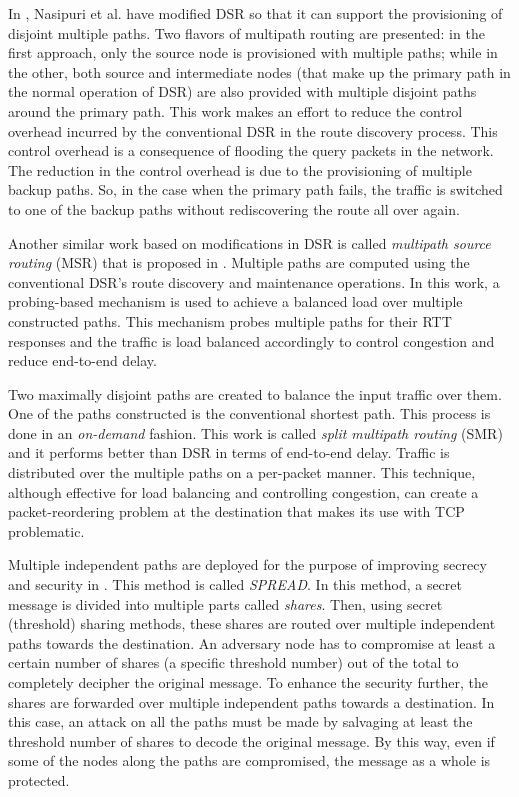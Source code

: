 \documentclass[10pt]{IEEEtran}
\begin{document}
In \cite{nasipuri1999demand}, Nasipuri et al. have modified DSR so that it can support the provisioning of disjoint multiple paths. Two flavors of multipath routing are presented: in the first approach, only the source node is provisioned with multiple paths; while in the other, both source and intermediate nodes (that make up the primary path in the normal operation of DSR) are also provided with multiple disjoint paths around the primary path. This work makes an effort to reduce the control overhead incurred by the conventional DSR in the route discovery process. This control overhead is a consequence of flooding the query packets in the network. The reduction in the control overhead is due to the provisioning of multiple backup paths. So, in the case when the primary path fails, the traffic is switched to one of the backup paths without rediscovering the route all over again.

Another similar work based on modifications in DSR is called \textit{multipath source routing} (MSR) that is proposed in \cite{wang2000multipath}. Multiple paths are computed using the conventional DSR's route discovery and maintenance operations. In this work, a probing-based mechanism is used to achieve a balanced load over multiple constructed paths. This mechanism probes multiple paths for their RTT responses and the traffic is load balanced accordingly to control congestion and reduce end-to-end delay.

Two maximally disjoint paths are created to balance the input traffic over them. One of the paths constructed is the conventional shortest path. This process is done in an \textit{on-demand} fashion. This work is called \textit{split multipath routing} (SMR) \cite{lee2001split} and it performs better than DSR in terms of end-to-end delay. Traffic is distributed over the multiple paths on a per-packet manner. This technique, although effective for load balancing and controlling congestion, can create a packet-reordering problem at the destination that makes its use with TCP problematic.

Multiple independent paths are deployed for the purpose of improving secrecy and security in \cite{lou2004spread}. This method is called \textit{SPREAD}. In this method, a secret message is divided into multiple parts called \textit{shares}. Then, using secret (threshold) sharing methods, these shares are routed over multiple independent paths towards the destination. An adversary node has to compromise at least a certain number of shares (a specific threshold number) out of the total to completely decipher the original message. To enhance the security further, the shares are forwarded over multiple independent paths towards a destination. In this case, an attack on all the paths must be made by salvaging at least the threshold number of shares to decode the original message. By this way, even if some of the nodes along the paths are compromised, the message as a whole is protected.
\end{document}
